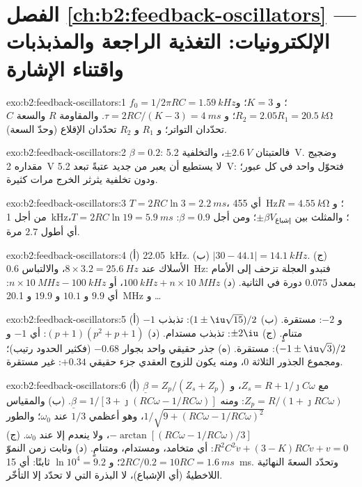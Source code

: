 \section*{الفصل \ref{ch:b2:feedback-oscillators} --- الإلكترونيات: التغذية الراجعة والمذبذبات واقتناء الإشارة}

\begin{solution}{exo:b2:feedback-oscillators:1}
$f_0 = 1/2\pi RC = \qty{1.59}{kHz}$؛ و $K = 3$؛ و $R_2 = 2.05R_1 = \qty{20.5}{k\ohm}$؛
و $\tau = 2RC/(K - 3) = \qty{4}{ms}$. والمقاومة $R$ والسعة $C$ تحدّدان التواتر؛ و $R_1$ و $R_2$
تحدّدان الإقلاع (وحدّ السعة).
\end{solution}

\begin{solution}{exo:b2:feedback-oscillators:2}
$\beta = 0.2$: فالعتبتان $\pm\qty{2.6}{V}$، والتخلفية \qty{5.2}{V}. وضجيج مقداره
\qty{2}{V} لا يستطيع أن يعبر من جديد عتبةً تبعد \qty{5.2}{V}: فتحوّل واحد في كل
عبور؛ ودون تخلفية يثرثر الخرج مرات كثيرة.
\end{solution}

\begin{solution}{exo:b2:feedback-oscillators:3}
$T = 2RC\ln3 = \qty{2.2}{ms}$، أي \qty{455}{Hz}؛ و $R = \qty{4.55}{k\ohm}$ من أجل \qty{1}{kHz}؛
والمثلث بين $\pm\beta V_{\text{إشباع}}$؛ ومن أجل $\beta = 0.9$: $T = 2RC\ln19 = \qty{5.9}{ms}$،
أي أطول $2.7$ مرة.
\end{solution}

\begin{solution}{exo:b2:feedback-oscillators:4}
(أ) \qty{22.05}{kHz}. (ب) $|30 - 44.1| = \qty{14.1}{kHz}$. (ج) الأسلاك عند $8 \times 3.2 =
\qty{25.6}{Hz}$، والالتباس \qty{0.6}{Hz}: فتبدو العجلة تزحف إلى الأمام بمعدل
$0.075$ دورة في الثانية. (د) $\qty{100}{kHz} + n \times \qty{10}{MHz}$، أو $n \times \qty{10}{MHz} -
\qty{100}{kHz}$: أي $9.9$ و $10.1$ و $19.9$ و \qty{20.1}{MHz} و \dots
\end{solution}

\begin{solution}{exo:b2:feedback-oscillators:5}
(أ) $-1$ و $-2$: مستقرة. (ب) $(1 \pm \iu\sqrt{15})/2$: تذبذب متنامٍ.
(ج) $\pm2\iu$: تذبذب مستدام. (د) $(p + 1)(p^2 + p + 1)$: أي $-1$ و
$(-1 \pm \iu\sqrt3)/2$: مستقرة. (ه) جذر حقيقي واحد بجوار $-0.68$ (فكثير
الحدود رتيب)؛ ومجموع الجذور الثلاثة $0$، ومنه يكون للزوج
العقدي جزء حقيقي $+0.34$: غير مستقرة.
\end{solution}

\begin{solution}{exo:b2:feedback-oscillators:6}
(أ) $\underline\beta = Z_p/(Z_s + Z_p)$ مع $Z_s = R + 1/\jmath C\omega$، و $Z_p = R/(1 +
\jmath RC\omega)$: ومنه $\underline\beta = 1/[3 + \jmath(RC\omega - 1/RC\omega)]$. (ب) والمقياس
$1/\sqrt{9 + (RC\omega - 1/RC\omega)^2}$، وهو أعظمي $1/3$ عند $\omega_0$؛ والطور $-\arctan
[(RC\omega - 1/RC\omega)/3]$، ولا ينعدم إلا عند $\omega_0$. (ج) $R^2C^2\ddot v + (3 - K)RC
\dot v + v = 0$: أي متخامد، ومستدام، ومتنامٍ. (د) وثابت زمن النموّ
$2RC/0.2 = 10RC = \qty{1.6}{ms}$؛ و $\ln10^4 = 9.2$ ثابتًا: أي \qty{15}{ms}. وتحدّد
السعةَ النهائية اللاخطيةُ (أي الإشباع)، لا البذرة
التي لا تحدّد إلا التأخّر.
\end{solution}


